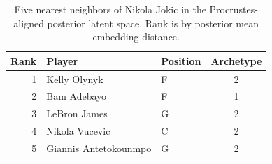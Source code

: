 \begin{table}[htbp]
  \centering\small
  \begin{tabular}{rllc}
    \toprule
    Rank & Player & Position & Archetype \\
    \midrule
    1 & Kelly Olynyk & F & 2 \\
    2 & Bam Adebayo & F & 1 \\
    3 & LeBron James & G & 2 \\
    4 & Nikola Vucevic & C & 2 \\
    5 & Giannis Antetokounmpo & G & 2 \\
    \bottomrule
  \end{tabular}
  \caption{Five nearest neighbors of Nikola Jokic in the Procrustes-aligned posterior latent space. Rank is by posterior mean embedding distance.}
  \label{tab:Nikola_Jokic_neighbors}
\end{table}

